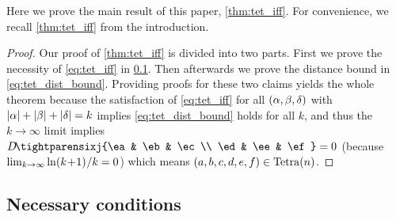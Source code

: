 \documentclass[notitlepage, 11pt, letterpaper]{amsart}
\begin{document}
Here we prove the main result of this paper, \cref{thm:tet_iff}.
For convenience, we recall \cref{thm:tet_iff} from the introduction.
\tetiffthm*

\begin{proof}
    Our proof of \cref{thm:tet_iff} is divided into two parts.
    First we prove the necessity of \cref{eq:tet_iff} in \cref{sec:tet_necess}.
    Then afterwards we prove the distance bound in \cref{eq:tet_dist_bound}.
    Providing proofs for these two claims yields the whole theorem because the satisfaction of \cref{eq:tet_iff} for all $(\alpha,\beta,\delta)$ with $|\alpha| + |\beta| + |\delta| = k$ implies \cref{eq:tet_dist_bound} holds for all $k$, and thus the $k \to \infty$ limit implies $D\!\tightparensixj{\ea & \eb & \ec \\ \ed & \ee & \ef}=0$ (because $\lim_{k \to \infty} \ln (k\!+\!1)^{}/k =0$) which means $(a, b, c, d, e, f) \in \operatorname{Tetra}(n)$.
\end{proof}

\subsection{Necessary conditions}
\label{sec:tet_necess}
\end{document}
